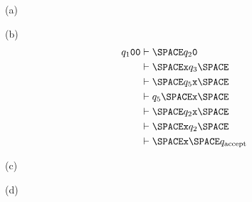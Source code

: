 
(a)

(b)
\begin{align*}
  q_1\texttt{00} &\vdash \SPACE q_2 \texttt{0} \\
        &\vdash \SPACE \texttt{x} q_3 \SPACE \\
        &\vdash \SPACE q_5 \texttt{x} \SPACE \\
        &\vdash q_5 \SPACE \texttt{x} \SPACE \\
        &\vdash \SPACE q_2 \texttt{x} \SPACE \\
        &\vdash \SPACE \texttt{x} q_2 \SPACE \\
        &\vdash \SPACE \texttt{x} \SPACE q_{\text{accept}} \\
\end{align*}

(c)

(d)
